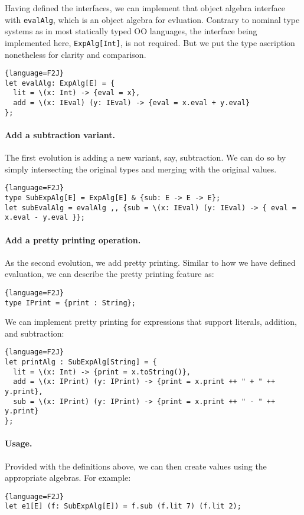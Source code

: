 
Having defined the interfaces, we can implement that object algebra interface
with \lstinline$evalAlg$, which is an object algebra for evluation. Contrary to
nominal type systems as in most statically typed OO languages, the interface
being implemented here, \lstinline$ExpAlg[Int]$, is not required. But we put the
type ascription nonetheless for clarity and comparison.
\begin{lstlisting}{language=F2J}
let evalAlg: ExpAlg[E] = {
  lit = \(x: Int) -> {eval = x},
  add = \(x: IEval) (y: IEval) -> {eval = x.eval + y.eval}
};
\end{lstlisting}

\paragraph{Add a subtraction variant.}
The first evolution is adding a new variant, say, subtraction. We can do so by
simply intersecting the original types and merging with the original values.
\begin{lstlisting}{language=F2J}
type SubExpAlg[E] = ExpAlg[E] & {sub: E -> E -> E};
let subEvalAlg = evalAlg ,, {sub = \(x: IEval) (y: IEval) -> { eval = x.eval - y.eval }};
\end{lstlisting}

\paragraph{Add a pretty printing operation.}
As the second evolution, we add pretty printing. Similar to how we have defined
evaluation, we can describe the pretty printing feature as:
\begin{lstlisting}{language=F2J}
type IPrint = {print : String};
\end{lstlisting}
We can implement pretty printing for expressions that support literals,
addition, and subtraction:
\begin{lstlisting}{language=F2J}
let printAlg : SubExpAlg[String] = {
  lit = \(x: Int) -> {print = x.toString()},
  add = \(x: IPrint) (y: IPrint) -> {print = x.print ++ " + " ++ y.print},
  sub = \(x: IPrint) (y: IPrint) -> {print = x.print ++ " - " ++ y.print}
};
\end{lstlisting}

\paragraph{Usage.}
Provided with the definitions above, we can then create values using the
appropriate algebras. For example:
\begin{lstlisting}{language=F2J}
let e1[E] (f: SubExpAlg[E]) = f.sub (f.lit 7) (f.lit 2);
\end{lstlisting}

